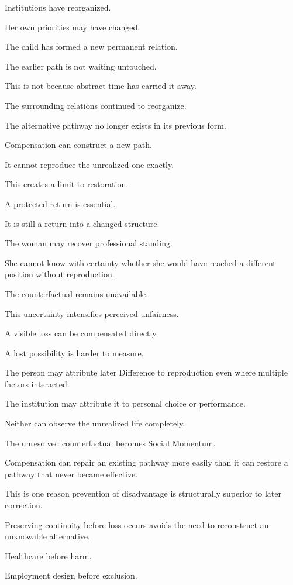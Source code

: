 Institutions have reorganized.

Her own priorities may have changed.

The child has formed a new permanent relation.

The earlier path is not waiting untouched.

This is not because abstract time has carried it away.

The surrounding relations continued to reorganize.

The alternative pathway no longer exists in its previous form.

Compensation can construct a new path.

It cannot reproduce the unrealized one exactly.

This creates a limit to restoration.

A protected return is essential.

It is still a return into a changed structure.

The woman may recover professional standing.

She cannot know with certainty whether she would have reached a different position without reproduction.

The counterfactual remains unavailable.

This uncertainty intensifies perceived unfairness.

A visible loss can be compensated directly.

A lost possibility is harder to measure.

The person may attribute later Difference to reproduction even where multiple factors interacted.

The institution may attribute it to personal choice or performance.

Neither can observe the unrealized life completely.

The unresolved counterfactual becomes Social Momentum.

Compensation can repair an existing pathway more easily than it can restore a pathway that never became effective.

This is one reason prevention of disadvantage is structurally superior to later correction.

Preserving continuity before loss occurs avoids the need to reconstruct an unknowable alternative.

Healthcare before harm.

Employment design before exclusion.

